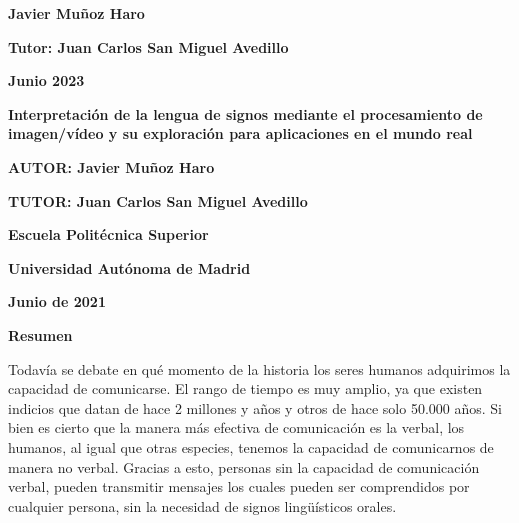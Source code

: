 \documentclass{article} %
\begin{document}
\noindent \textbf{}

\noindent \textbf{}

\noindent \textbf{Javier Mu\~{n}oz Haro}

\noindent \textbf{Tutor: Juan Carlos San Miguel Avedillo}

\noindent \textbf{}

\noindent \textbf{}

\noindent \textbf{Junio 2023}

\noindent 

\noindent 

\noindent 

\noindent 

\noindent 

\noindent 

\noindent 

\noindent 

\noindent 

\noindent 

\noindent 

\noindent 

\noindent 

\noindent 

\noindent \textbf{Interpretaci\'{o}n de la lengua de signos mediante el procesamiento de imagen/v\'{i}deo y su exploraci\'{o}n para aplicaciones en el mundo real}

\noindent 

\noindent 

\noindent \textbf{AUTOR: Javier Mu\~{n}oz Haro}

\noindent \textbf{TUTOR: Juan Carlos San Miguel Avedillo}

\noindent \textbf{}

\noindent \textbf{}

\noindent \textbf{}

\noindent \textbf{}

\noindent \textbf{Escuela Polit\'{e}cnica Superior}

\noindent \textbf{Universidad Aut\'{o}noma de Madrid}

\noindent \textbf{Junio de 2021}

\noindent 

\noindent \textbf{\eject Resumen }

\noindent Todav\'{i}a se debate en qu\'{e} momento de la historia los seres humanos adquirimos la capacidad de comunicarse. El rango de tiempo es muy amplio, ya que existen indicios que datan de hace 2 millones y a\~{n}os y otros de hace solo 50.000 a\~{n}os. Si bien es cierto que la manera m\'{a}s efectiva de comunicaci\'{o}n es la verbal, los humanos, al igual que otras especies, tenemos la capacidad de comunicarnos de manera no verbal. Gracias a esto, personas sin la capacidad de comunicaci\'{o}n verbal, pueden transmitir mensajes los cuales pueden ser comprendidos por cualquier persona, sin la necesidad de signos ling\"{u}\'{i}sticos orales.
\end{document}
